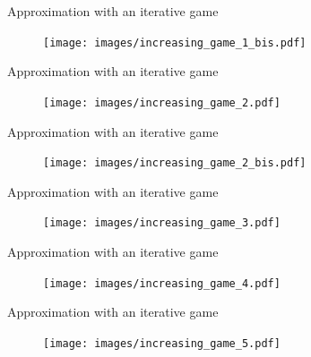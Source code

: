 \documentclass[10pt,aspectratio=169]{beamer}
\begin{document}
\begin{frame}{Approximation with an iterative game}
  \begin{figure}
        \texttt{[image: images/increasing\_game\_1\_bis.pdf]}
\end{figure}
\end{frame}


\begin{frame}{Approximation with an iterative game}
  \begin{figure}
        \texttt{[image: images/increasing\_game\_2.pdf]}
\end{figure}
\end{frame}

\begin{frame}{Approximation with an iterative game}
  \begin{figure}
        \texttt{[image: images/increasing\_game\_2\_bis.pdf]}
\end{figure}
\end{frame}

\begin{frame}{Approximation with an iterative game}
  \begin{figure}
        \texttt{[image: images/increasing\_game\_3.pdf]}
\end{figure}
\end{frame}


\begin{frame}{Approximation with an iterative game}
  \begin{figure}
        \texttt{[image: images/increasing\_game\_4.pdf]}
\end{figure}
\end{frame}


\begin{frame}{Approximation with an iterative game}
  \begin{figure}
        \texttt{[image: images/increasing\_game\_5.pdf]}
\end{figure}
\end{frame}




    
\end{document}
